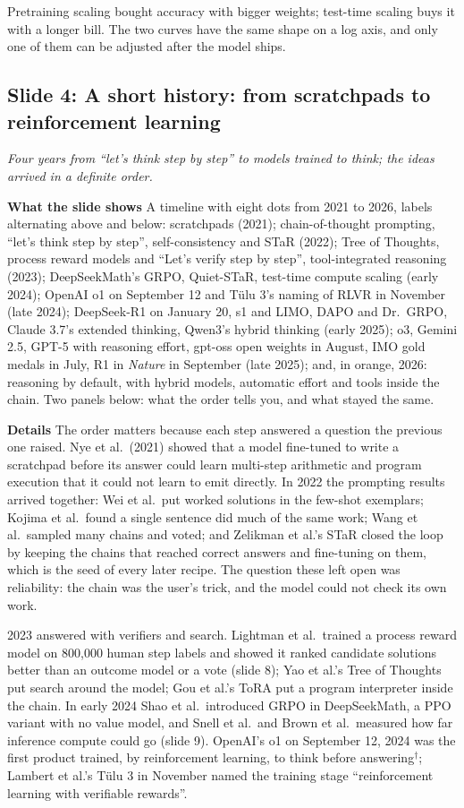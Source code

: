 \documentclass[11pt,letterpaper]{article}
\newcommand{\slide}[3]{%
  \subsection[Slide #1: #2]{Slide #1: #2}%
  {\color{muted}\itshape #3\par}\medskip}
\newcommand{\para}[1]{\medskip\noindent\textbf{#1}\quad}
\newenvironment{intuition}{\begin{tcolorbox}[intuitionbox]}{\end{tcolorbox}}
\begin{document}
\begin{intuition}
Pretraining scaling bought accuracy with bigger weights; test-time scaling buys it with a longer bill. The two curves have the same shape on a log axis, and only one of them can be adjusted after the model ships.
\end{intuition}

\slide{4}{A short history: from scratchpads to reinforcement learning}{Four years from ``let's think step by step'' to models trained to think; the ideas arrived in a definite order.}

\para{What the slide shows} A timeline with eight dots from 2021 to 2026, labels alternating above and below: scratchpads (2021); chain-of-thought prompting, ``let's think step by step'', self-consistency and STaR (2022); Tree of Thoughts, process reward models and ``Let's verify step by step'', tool-integrated reasoning (2023); DeepSeekMath's GRPO, Quiet-STaR, test-time compute scaling (early 2024); OpenAI o1 on September 12 and T\"ulu 3's naming of RLVR in November (late 2024); DeepSeek-R1 on January 20, s1 and LIMO, DAPO and Dr.\ GRPO, Claude 3.7's extended thinking, Qwen3's hybrid thinking (early 2025); o3, Gemini 2.5, GPT-5 with reasoning effort, gpt-oss open weights in August, IMO gold medals in July, R1 in \emph{Nature} in September (late 2025); and, in orange, 2026: reasoning by default, with hybrid models, automatic effort and tools inside the chain. Two panels below: what the order tells you, and what stayed the same.

\para{Details} The order matters because each step answered a question the previous one raised. Nye et al.\ (2021) showed that a model fine-tuned to write a scratchpad before its answer could learn multi-step arithmetic and program execution that it could not learn to emit directly. In 2022 the prompting results arrived together: Wei et al.\ put worked solutions in the few-shot exemplars; Kojima et al.\ found a single sentence did much of the same work; Wang et al.\ sampled many chains and voted; and Zelikman et al.'s STaR closed the loop by keeping the chains that reached correct answers and fine-tuning on them, which is the seed of every later recipe. The question these left open was reliability: the chain was the user's trick, and the model could not check its own work.

2023 answered with verifiers and search. Lightman et al.\ trained a process reward model on 800,000 human step labels and showed it ranked candidate solutions better than an outcome model or a vote (slide 8); Yao et al.'s Tree of Thoughts put search around the model; Gou et al.'s ToRA put a program interpreter inside the chain. In early 2024 Shao et al.\ introduced GRPO in DeepSeekMath, a PPO variant with no value model, and Snell et al.\ and Brown et al.\ measured how far inference compute could go (slide 9). OpenAI's o1 on September 12, 2024 was the first product trained, by reinforcement learning, to think before answering$^\dagger$; Lambert et al.'s T\"ulu 3 in November named the training stage ``reinforcement learning with verifiable rewards''.
\end{document}
